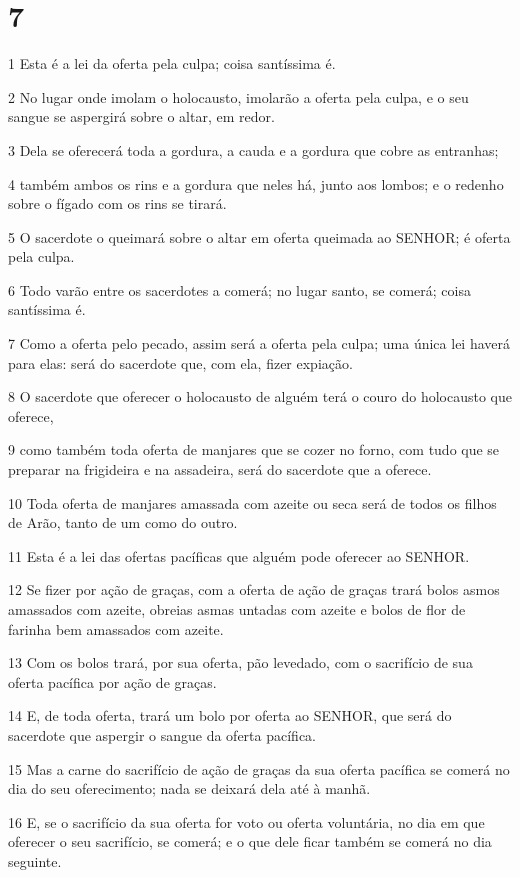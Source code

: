 \chapter{7}

\par 1 Esta é a lei da oferta pela culpa; coisa santíssima é.
\par 2 No lugar onde imolam o holocausto, imolarão a oferta pela culpa, e o seu sangue se aspergirá sobre o altar, em redor.
\par 3 Dela se oferecerá toda a gordura, a cauda e a gordura que cobre as entranhas;
\par 4 também ambos os rins e a gordura que neles há, junto aos lombos; e o redenho sobre o fígado com os rins se tirará.
\par 5 O sacerdote o queimará sobre o altar em oferta queimada ao SENHOR; é oferta pela culpa.
\par 6 Todo varão entre os sacerdotes a comerá; no lugar santo, se comerá; coisa santíssima é.
\par 7 Como a oferta pelo pecado, assim será a oferta pela culpa; uma única lei haverá para elas: será do sacerdote que, com ela, fizer expiação.
\par 8 O sacerdote que oferecer o holocausto de alguém terá o couro do holocausto que oferece,
\par 9 como também toda oferta de manjares que se cozer no forno, com tudo que se preparar na frigideira e na assadeira, será do sacerdote que a oferece.
\par 10 Toda oferta de manjares amassada com azeite ou seca será de todos os filhos de Arão, tanto de um como do outro.
\par 11 Esta é a lei das ofertas pacíficas que alguém pode oferecer ao SENHOR.
\par 12 Se fizer por ação de graças, com a oferta de ação de graças trará bolos asmos amassados com azeite, obreias asmas untadas com azeite e bolos de flor de farinha bem amassados com azeite.
\par 13 Com os bolos trará, por sua oferta, pão levedado, com o sacrifício de sua oferta pacífica por ação de graças.
\par 14 E, de toda oferta, trará um bolo por oferta ao SENHOR, que será do sacerdote que aspergir o sangue da oferta pacífica.
\par 15 Mas a carne do sacrifício de ação de graças da sua oferta pacífica se comerá no dia do seu oferecimento; nada se deixará dela até à manhã.
\par 16 E, se o sacrifício da sua oferta for voto ou oferta voluntária, no dia em que oferecer o seu sacrifício, se comerá; e o que dele ficar também se comerá no dia seguinte.
